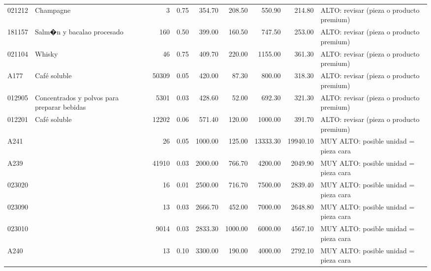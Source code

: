 \begin{table}[ht]
\begin{tabular}{llrrrrrrl}
  021212 & Champagne &   3 & 0.75 & 354.70 & 208.50 & 550.90 & 214.80 & ALTO: revisar (pieza o producto premium) \\ 
  181157 & Salm�n y bacalao procesado & 160 & 0.50 & 399.00 & 160.50 & 747.50 & 253.00 & ALTO: revisar (pieza o producto premium) \\ 
  021104 & Whisky &  46 & 0.75 & 409.70 & 220.00 & 1155.00 & 361.30 & ALTO: revisar (pieza o producto premium) \\ 
  A177 & Café soluble & 50309 & 0.05 & 420.00 & 87.30 & 800.00 & 318.30 & ALTO: revisar (pieza o producto premium) \\ 
  012905 & Concentrados y polvos para preparar bebidas & 5301 & 0.03 & 428.60 & 52.00 & 692.30 & 321.30 & ALTO: revisar (pieza o producto premium) \\ 
  012201 & Café soluble & 12202 & 0.06 & 571.40 & 120.00 & 1000.00 & 391.70 & ALTO: revisar (pieza o producto premium) \\ 
  A241 &  &  26 & 0.05 & 1000.00 & 125.00 & 13333.30 & 19940.10 & MUY ALTO: posible unidad = pieza cara \\ 
  A239 &  & 41910 & 0.03 & 2000.00 & 766.70 & 4200.00 & 2049.90 & MUY ALTO: posible unidad = pieza cara \\ 
  023020 &  &  16 & 0.01 & 2500.00 & 716.70 & 7500.00 & 2839.40 & MUY ALTO: posible unidad = pieza cara \\ 
  023090 &  &  13 & 0.03 & 2666.70 & 452.00 & 7000.00 & 2648.80 & MUY ALTO: posible unidad = pieza cara \\ 
  023010 &  & 9014 & 0.03 & 2833.30 & 1000.00 & 6000.00 & 4567.10 & MUY ALTO: posible unidad = pieza cara \\ 
  A240 &  &  13 & 0.10 & 3300.00 & 190.00 & 4000.00 & 2792.10 & MUY ALTO: posible unidad = pieza cara \\ 
   \bottomrule
\end{tabular}
\end{table}
